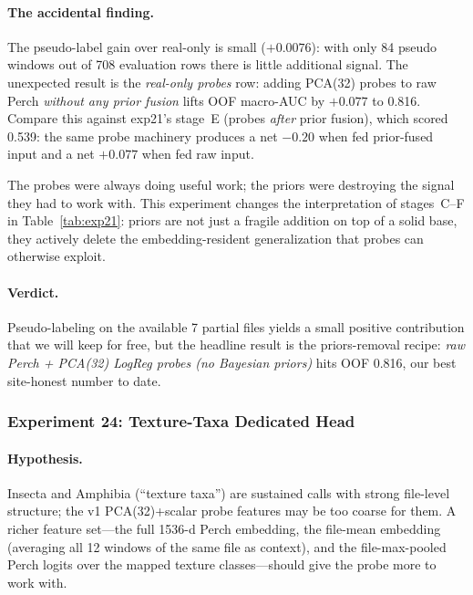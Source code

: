 \paragraph{The accidental finding.}
The pseudo-label gain over real-only is small ($+0.0076$): with only 84
pseudo windows out of 708 evaluation rows there is little additional
signal. The unexpected result is the \emph{real-only probes} row:
adding PCA(32) probes to raw Perch \emph{without any prior fusion}
lifts OOF macro-AUC by $+0.077$ to 0.816. Compare this against
exp21's stage~E (probes \emph{after} prior fusion), which scored 0.539:
the same probe machinery produces a net $-0.20$ when fed prior-fused
input and a net $+0.077$ when fed raw input.

The probes were always doing useful work; the priors were destroying
the signal they had to work with. This experiment changes the
interpretation of stages~C--F in Table~\ref{tab:exp21}: priors are
not just a fragile addition on top of a solid base, they actively
delete the embedding-resident generalization that probes can otherwise
exploit.

\paragraph{Verdict.}
Pseudo-labeling on the available 7 partial files yields a small
positive contribution that we will keep for free, but the headline
result is the priors-removal recipe: \emph{raw Perch + PCA(32) LogReg
probes (no Bayesian priors)} hits OOF 0.816, our best site-honest
number to date.

\subsubsection{Experiment 24: Texture-Taxa Dedicated Head}
\label{sec:exp24}

\paragraph{Hypothesis.}
Insecta and Amphibia (``texture taxa'') are sustained calls with strong
file-level structure; the v1 PCA(32)+scalar probe features may be too
coarse for them. A richer feature set---the full 1536-d Perch
embedding, the file-mean embedding (averaging all 12 windows of the
same file as context), and the file-max-pooled Perch logits over the
mapped texture classes---should give the probe more to work with.

